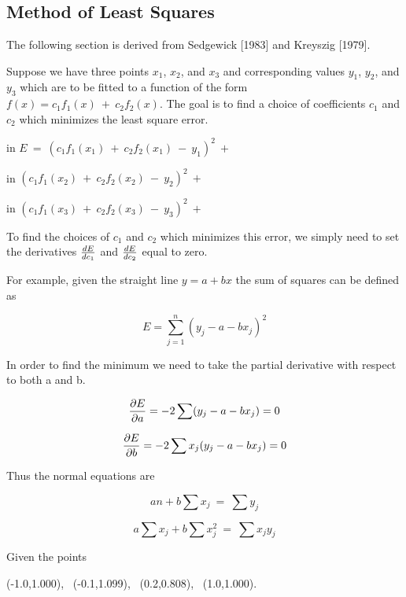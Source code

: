 \parskip 0.20in
\textheight 8.75in
\textwidth 6.0in
\topmargin -0.25in
\oddsidemargin 0.40in
\appendix

\baselineskip 0.30in

\setcounter{page}{58}
\setcounter{chapter}{2}

\chapter{}
\section{Method of Least Squares}

	The following section is derived from Sedgewick [1983]
and Kreyszig [1979].

	Suppose we have three points $x_1$, $x_2$, and $x_3$ and
corresponding values $y_1$, $y_2$, and $y_3$ which are to be fitted to
a function of the form $f(x) = c_1 f_1(x)\ + \ c_2 f_2(x)$.  The goal
is to find a choice of coefficients $c_1$ and $c_2$ which minimizes
the least square error.

 in  $E \  = \ (c_1 f_1(x_1) \  + \  c_2 f_2(x_1) \ - \ y_1)^2 \ +$ 

 in  $(c_1 f_1(x_2) \  + \  c_2 f_2(x_2) \ - \ y_2)^2 \ +$ 

 in  $(c_1 f_1(x_3) \  + \  c_2 f_2(x_3) \ - \ y_3)^2 \ +$ 

	To find the choices of $c_1$ and $c_2$ which minimizes this
error, we simply need to set the derivatives $dE \over dc_1$ and $dE
\over dc_2$ equal to zero.

	For example, given the straight line $y = a + bx$ the sum of
squares can be defined as

	$$E = \sum_{j = 1}^n (y_j - a - bx_j)^2$$

	In order to find the minimum we need to take the partial
derivative with respect to both a and b.  

	$${\partial E \over \partial a} = - 2 \sum (y_j - a - bx_j) = 0$$

	$${\partial E \over \partial b} = - 2 \sum x_j (y_j - a -
bx_j) = 0$$

	Thus the normal equations are

	$$an + b \sum x_j \ = \ \sum y_j$$

	$$a \sum x_j + b \sum x_j^2 \ = \ \sum x_j y_j$$

	Given the points 

          (-1.0,1.000), \   (-0.1,1.099), \   (0.2,0.808), \   (1.0,1.000).  

